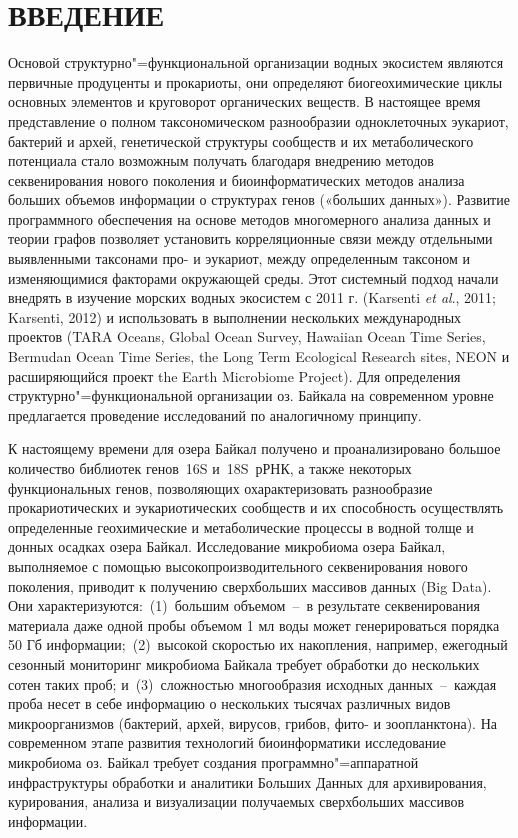 \documentclass[a4paper,12pt,openany,final]{extreport}
\begin{document}
\chapter*{ВВЕДЕНИЕ}

Основой структурно"=функциональной организации водных экосистем являются первичные продуценты и прокариоты, они определяют биогеохимические циклы основных элементов и круговорот органических веществ. В настоящее время представление о полном таксономическом разнообразии одноклеточных эукариот, бактерий и архей, генетической структуры сообществ и их метаболического потенциала стало возможным получать благодаря внедрению методов секвенирования нового поколения и биоинформатических методов анализа больших объемов информации о структурах генов («больших данных»). Развитие программного обеспечения на основе методов многомерного анализа данных и теории графов позволяет установить корреляционные связи между отдельными выявленными таксонами про- и эукариот, между определенным таксоном и изменяющимися факторами окружающей среды. Этот системный подход начали внедрять в изучение морских водных экосистем с 2011 г. (Karsenti \emph{et al}., 2011; Karsenti, 2012) и использовать в выполнении нескольких международных проектов (TARA Oceans, Global Ocean Survey, Hawaiian Ocean Time Series, Bermudan Ocean Time Series, the Long Term Ecological Research sites, NEON и расширяющийся проект the Earth Microbiome Project). Для определения структурно"=функциональной организации оз. Байкала на современном уровне предлагается проведение исследований по аналогичному принципу.

К настоящему времени для озера Байкал получено и проанализировано большое количество библиотек генов~16S и~18S~рРНК, а также некоторых функциональных генов, позволяющих охарактеризовать разнообразие прокариотических и эукариотических сообществ и их способность осуществлять определенные геохимические и метаболические процессы в водной толще и донных осадках озера Байкал. Исследование микробиома озера Байкал, выполняемое с помощью высокопроизводительного секвенирования нового поколения, приводит к получению сверхбольших массивов данных (Big Data). Они характеризуются:~(1)~большим объемом~--~в результате секвенирования материала даже одной пробы объемом 1 мл воды может генерироваться порядка 50 Гб информации;~(2)~высокой скоростью их накопления, например, ежегодный сезонный мониторинг микробиома Байкала требует обработки до нескольких сотен таких проб; и~(3)~сложностью многообразия исходных данных~--~каждая проба несет в себе информацию о нескольких тысячах различных видов микроорганизмов (бактерий, архей, вирусов, грибов, фито- и зоопланктона). На современном этапе развития технологий биоинформатики исследование микробиома оз. Байкал требует создания программно"=аппаратной инфраструктуры обработки и аналитики Больших Данных для архивирования, курирования, анализа и визуализации получаемых сверхбольших массивов информации.
\end{document}
